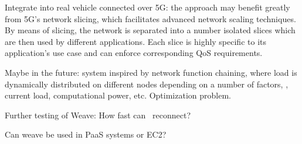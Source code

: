 Integrate into real vehicle connected over 5G: the approach may benefit greatly from 5G's network slicing, which facilitates advanced network scaling techniques. By means of slicing, the network is separated into a number isolated slices which are then used by different applications. Each slice is highly specific to its application's use case and can enforce corresponding QoS requirements.

Maybe in the future: system inspired by network function chaining, where load is dynamically distributed on different nodes depending on a number of factors, \eg , current load, computational power, etc. Optimization problem.



Further testing of Weave: How fast can \wnet\ reconnect?

Can weave be used in PaaS systems or EC2?